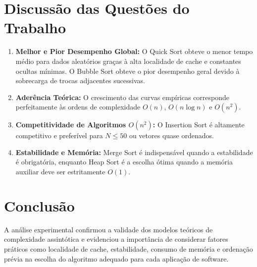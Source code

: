 \documentclass[12pt,a4paper]{article}
\begin{document}
\section{Discussão das Questões do Trabalho}
\begin{enumerate}
    \item \textbf{Melhor e Pior Desempenho Global:} O Quick Sort obteve o menor tempo médio para dados aleatórios graças à alta localidade de cache e constantes ocultas mínimas. O Bubble Sort obteve o pior desempenho geral devido à sobrecarga de trocas adjacentes sucessivas.
    \item \textbf{Aderência Teórica:} O crescimento das curvas empíricas corresponde perfeitamente às ordens de complexidade $O(n)$, $O(n \log n)$ e $O(n^2)$.
    \item \textbf{Competitividade de Algoritmos $O(n^2)$:} O Insertion Sort é altamente competitivo e preferível para $N \le 50$ ou vetores quase ordenados.
    \item \textbf{Estabilidade e Memória:} Merge Sort é indispensável quando a estabilidade é obrigatória, enquanto Heap Sort é a escolha ótima quando a memória auxiliar deve ser estritamente $O(1)$.
\end{enumerate}

\section{Conclusão}
A análise experimental confirmou a validade dos modelos teóricos de complexidade assintótica e evidenciou a importância de considerar fatores práticos como localidade de cache, estabilidade, consumo de memória e ordenação prévia na escolha do algoritmo adequado para cada aplicação de software.



\end{document}

